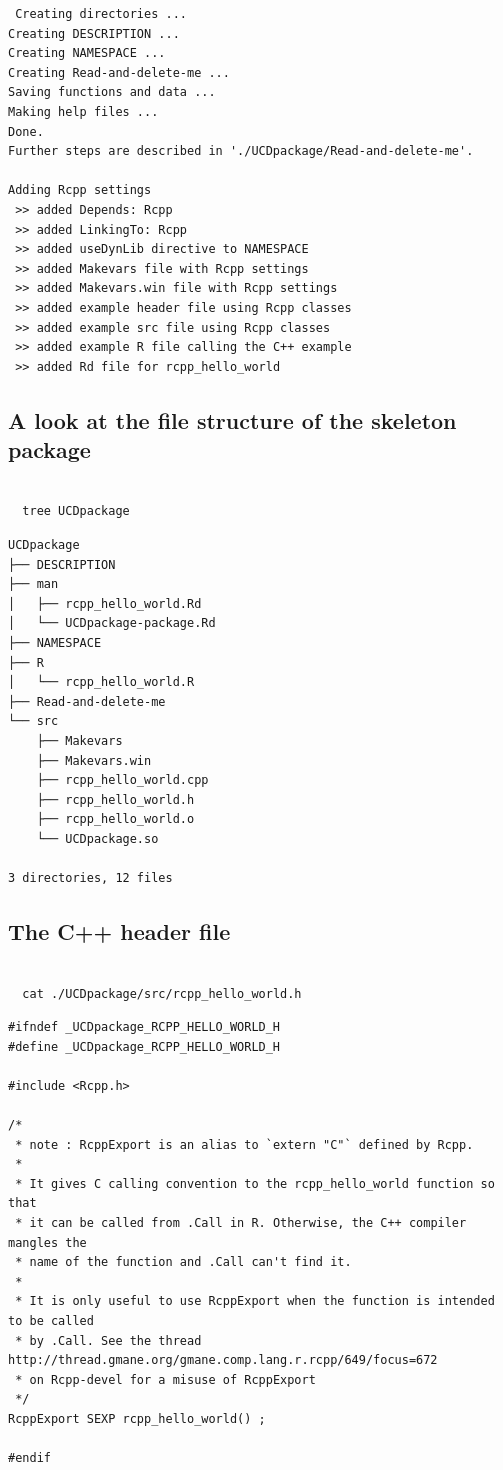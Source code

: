 \documentclass[11pt]{article}
\begin{document}
\begin{verbatim}
 Creating directories ...
Creating DESCRIPTION ...
Creating NAMESPACE ...
Creating Read-and-delete-me ...
Saving functions and data ...
Making help files ...
Done.
Further steps are described in './UCDpackage/Read-and-delete-me'.

Adding Rcpp settings
 >> added Depends: Rcpp
 >> added LinkingTo: Rcpp
 >> added useDynLib directive to NAMESPACE
 >> added Makevars file with Rcpp settings
 >> added Makevars.win file with Rcpp settings
 >> added example header file using Rcpp classes
 >> added example src file using Rcpp classes
 >> added example R file calling the C++ example
 >> added Rd file for rcpp_hello_world
\end{verbatim}
\subsection{A look at the file structure of the skeleton package}
\label{sec-8-2}



\begin{verbatim}
  
  tree UCDpackage
\end{verbatim}


\begin{verbatim}
UCDpackage
├── DESCRIPTION
├── man
│   ├── rcpp_hello_world.Rd
│   └── UCDpackage-package.Rd
├── NAMESPACE
├── R
│   └── rcpp_hello_world.R
├── Read-and-delete-me
└── src
    ├── Makevars
    ├── Makevars.win
    ├── rcpp_hello_world.cpp
    ├── rcpp_hello_world.h
    ├── rcpp_hello_world.o
    └── UCDpackage.so

3 directories, 12 files
\end{verbatim}
\subsection{The C++ header file}
\label{sec-8-3}



\begin{verbatim}
  
  cat ./UCDpackage/src/rcpp_hello_world.h
\end{verbatim}


\begin{verbatim}
#ifndef _UCDpackage_RCPP_HELLO_WORLD_H
#define _UCDpackage_RCPP_HELLO_WORLD_H

#include <Rcpp.h>

/*
 * note : RcppExport is an alias to `extern "C"` defined by Rcpp.
 *
 * It gives C calling convention to the rcpp_hello_world function so that 
 * it can be called from .Call in R. Otherwise, the C++ compiler mangles the 
 * name of the function and .Call can't find it.
 *
 * It is only useful to use RcppExport when the function is intended to be called
 * by .Call. See the thread http://thread.gmane.org/gmane.comp.lang.r.rcpp/649/focus=672
 * on Rcpp-devel for a misuse of RcppExport
 */
RcppExport SEXP rcpp_hello_world() ;

#endif
\end{verbatim}
\end{document}
